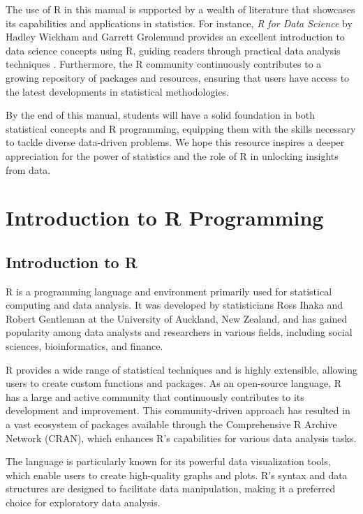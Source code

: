 \documentclass[12pt]{book}
\begin{document}
The use of R in this manual is supported by a wealth of literature that showcases its capabilities and applications in statistics. For instance, \textit{R for Data Science} by Hadley Wickham and Garrett Grolemund provides an excellent introduction to data science concepts using R, guiding readers through practical data analysis techniques \cite{wickham2017r}. Furthermore, the R community continuously contributes to a growing repository of packages and resources, ensuring that users have access to the latest developments in statistical methodologies.

By the end of this manual, students will have a solid foundation in both statistical concepts and R programming, equipping them with the skills necessary to tackle diverse data-driven problems. We hope this resource inspires a deeper appreciation for the power of statistics and the role of R in unlocking insights from data.




\chapter{Introduction to R Programming}

\section{Introduction to R}

R is a programming language and environment primarily used for statistical computing and data analysis. It was developed by statisticians Ross Ihaka and Robert Gentleman at the University of Auckland, New Zealand, and has gained popularity among data analysts and researchers in various fields, including social sciences, bioinformatics, and finance.

R provides a wide range of statistical techniques and is highly extensible, allowing users to create custom functions and packages. As an open-source language, R has a large and active community that continuously contributes to its development and improvement. This community-driven approach has resulted in a vast ecosystem of packages available through the Comprehensive R Archive Network (CRAN), which enhances R's capabilities for various data analysis tasks.

The language is particularly known for its powerful data visualization tools, which enable users to create high-quality graphs and plots. R's syntax and data structures are designed to facilitate data manipulation, making it a preferred choice for exploratory data analysis.
\end{document}
